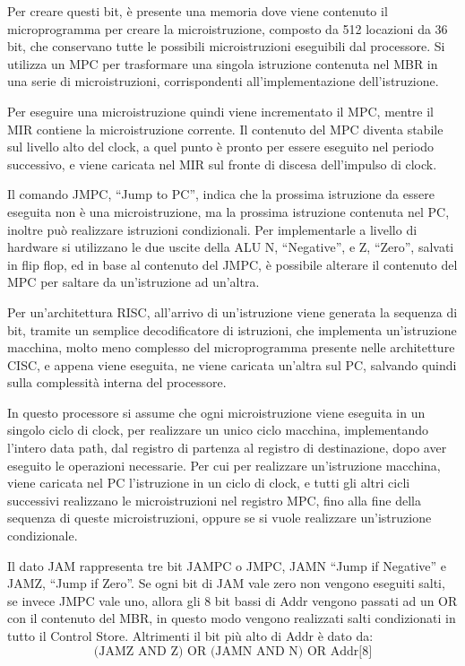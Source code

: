 \documentclass{article}
\numberwithin{equation}{subsection}
\begin{document}
Per creare questi bit, è presente una memoria dove viene contenuto il microprogramma per creare la microistruzione, composto da 512 locazioni da 36 bit, che conservano tutte le possibili 
microistruzioni eseguibili dal processore. 
Si utilizza un MPC per trasformare una singola istruzione contenuta nel MBR in una serie di microistruzioni, corrispondenti all'implementazione dell'istruzione. 

Per eseguire una microistruzione quindi viene incrementato il MPC, mentre il MIR contiene la microistruzione corrente. Il contenuto del MPC diventa stabile sul livello alto del clock, 
a quel punto è pronto per essere eseguito nel periodo successivo, e viene caricata nel MIR sul fronte di discesa dell'impulso di clock. 

Il comando JMPC, ``Jump to PC'', indica che la prossima istruzione da essere eseguita non è una microistruzione, ma la prossima istruzione contenuta nel PC, inoltre 
può realizzare istruzioni condizionali. 
Per implementarle a livello di hardware si utilizzano le due uscite della ALU N, ``Negative'', e Z, ``Zero'', salvati in flip flop, ed in base al contenuto 
del JMPC, è possibile alterare il contenuto del MPC per saltare da un'istruzione ad un'altra. 


Per un'architettura RISC, all'arrivo di un'istruzione viene generata la sequenza di bit, tramite un semplice decodificatore di istruzioni, che implementa un'istruzione macchina, 
molto meno complesso del microprogramma presente nelle architetture CISC, e appena viene eseguita, ne viene caricata un'altra sul PC, salvando quindi sulla complessità interna 
del processore. 


In questo processore si assume che ogni microistruzione viene eseguita in un singolo ciclo di clock, per realizzare un unico ciclo macchina, implementando l'intero data 
path, dal registro di partenza al registro di destinazione, dopo aver eseguito le operazioni necessarie. Per cui per realizzare un'istruzione macchina, viene caricata nel 
PC l'istruzione in un ciclo di clock, e tutti gli altri cicli successivi realizzano le microistruzioni nel registro MPC, fino alla fine della sequenza di queste 
microistruzioni, oppure se si vuole realizzare un'istruzione condizionale. 

Il dato JAM rappresenta tre bit JAMPC o JMPC, JAMN ``Jump if Negative'' e JAMZ, ``Jump if Zero''. Se ogni bit di JAM vale zero non vengono eseguiti salti, se invece JMPC vale 
uno, allora gli 8 bit bassi di Addr vengono passati ad un OR con il contenuto del MBR, in questo modo vengono realizzati salti condizionati in tutto il Control Store. 
Altrimenti il bit più alto di Addr è dato da: 
\begin{equation*}
    \mbox{(JAMZ AND Z) OR (JAMN AND N) OR Addr[8]}
\end{equation*}
\end{document}
